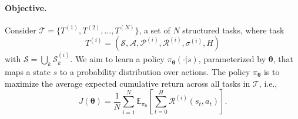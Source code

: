 \documentclass{article}
\begin{document}
\paragraph{Objective.} 
Consider $\mathcal{T} = \{T^{(1)}, T^{(2)}, \dots, T^{(N)}\}$, a set of $N$ structured tasks, where task 
\[
T^{(i)}=\left(\mathcal{S},\mathcal{A},\mathcal{P}^{(i)},\mathcal{R}^{(i)},\sigma^{(i)}, H\right)
\]
with $\mathcal{S}=\bigcup_k\mathcal{S}_k^{(i)}$.
We aim to learn a policy $\pi_{\bm{\theta}}(\cdot | s)$, parameterized by $\bm{\theta}$, that maps a state $s$ to a probability distribution over actions.
The policy $\pi_{\bm{\theta}}$ is to maximize the average expected cumulative return across all tasks in $\mathcal{T}$, i.e.,  
\begin{equation*}
J(\bm{\theta}) = \frac{1}{N} \sum_{i=1}^{N} \mathbb{E}_{\pi_{\bm{\theta}}} \left[ \sum_{t=0}^{H} \mathcal{R}^{(i)}(s_{t}, a_{t}) \right].
\end{equation*}


\end{document}
